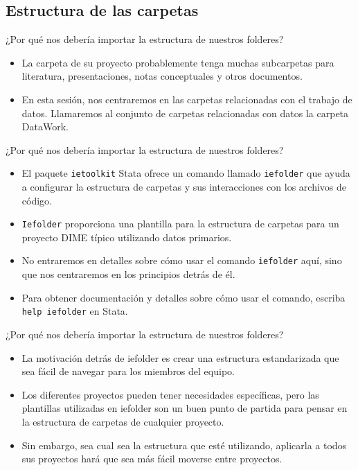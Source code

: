 \documentclass[11pt, aspectratio=169, compress]{beamer}
\begin{document}
\subsection{Estructura de las carpetas}
\begin{frame}[t]{¿Por qué nos debería importar la estructura de nuestros folderes?}
	\begin{itemize}
		\item La carpeta de su proyecto probablemente tenga muchas subcarpetas para literatura, presentaciones, notas conceptuales y otros documentos.
		\item En esta sesión, nos centraremos en las carpetas relacionadas con el trabajo de datos. Llamaremos al conjunto de carpetas relacionadas con datos la carpeta DataWork.
	\end{itemize}
\end{frame}
\begin{frame}[t]{¿Por qué nos debería importar la estructura de nuestros folderes?}
	\begin{itemize}
		\item El paquete \texttt{ietoolkit} Stata ofrece un comando llamado \texttt{iefolder} que ayuda a configurar la estructura de carpetas y sus interacciones con los archivos de código. 
		\item \texttt{Iefolder} proporciona una plantilla para la estructura de carpetas para un proyecto DIME típico utilizando datos primarios.
		\item No entraremos en detalles sobre cómo usar el comando \texttt{iefolder} aquí, sino que nos centraremos en los principios detrás de él.
		\item Para obtener documentación y detalles sobre cómo usar el comando, escriba \texttt{help iefolder} en Stata.
	\end{itemize}
\end{frame}
\begin{frame}[t]{¿Por qué nos debería importar la estructura de nuestros folderes?}
	\begin{itemize}
		\item La motivación detrás de iefolder es crear una estructura estandarizada que sea fácil de navegar para los miembros del equipo.
		\item Los diferentes proyectos pueden tener necesidades específicas, pero las plantillas utilizadas en iefolder son un buen punto de partida para pensar en la estructura de carpetas de cualquier proyecto.
		\item Sin embargo, sea cual sea la estructura que esté utilizando, aplicarla a todos sus proyectos hará que sea más fácil moverse entre proyectos.
	\end{itemize}
\end{frame}
\end{document}
